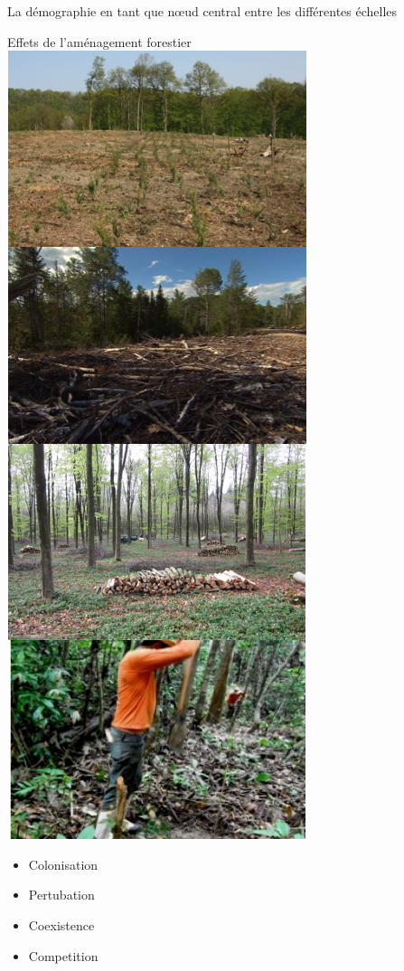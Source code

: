 \documentclass[11pt, compress, aspectratio=1610]{beamer}
\begin{document}
\begin{frame}{La démographie en tant que nœud central entre les
différentes échelles}
\begin{frame}{Effets de l’aménagement forestier}
\includegraphics[scale=0.50]{figures/managPrac}

\par
\hfill{}
  \begin{itemize}
    \item
      \vspace*{-8mm}
      Colonisation
    \item
      \vspace*{11mm}
      Pertubation
    \item
      \vspace*{11mm}
      Coexistence
    \item
      \vspace*{11mm}
      Competition
  \end{itemize}
\hfill{}
  \vspace*{-15mm}


\end{frame}
\end{frame}
\end{document}

